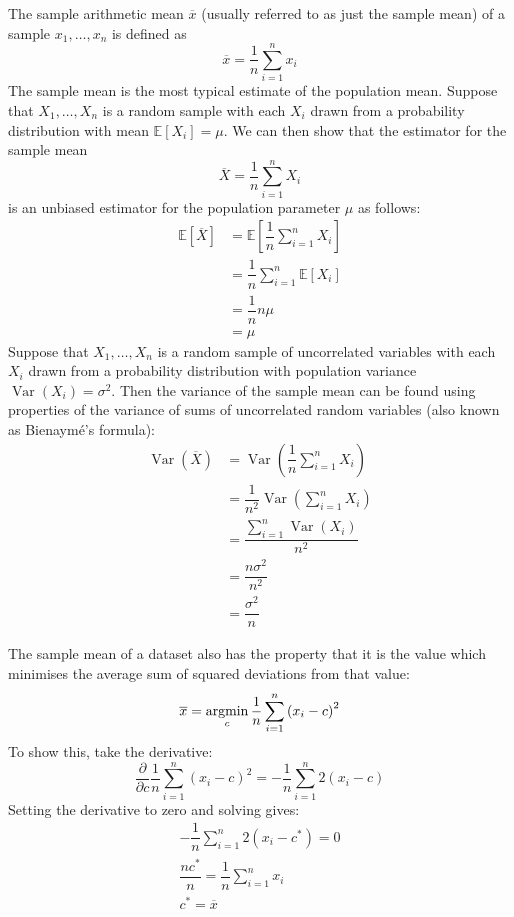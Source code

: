 \documentclass[11pt]{report} %
\begin{document}
The sample arithmetic mean $\overline{x}$ (usually referred to as just the sample mean) of a sample $x_{1}, \dots, x_{n}$ is defined as
\begin{equation}
\overline{x} = \dfrac{1}{n}\sum_{i = 1}^{n}x_{i}
\end{equation}
The sample mean is the most typical estimate of the population mean. Suppose that $X_{1}, \dots, X_{n}$ is a random sample with each $X_{i}$ drawn from a probability distribution with mean $\mathbb{E}\left[X_{i}\right] = \mu$. We can then show that the estimator for the sample mean
\begin{equation}
\overline{X} = \dfrac{1}{n}\sum_{i = 1}^{n}X_{i}
\end{equation}
is an unbiased estimator for the population parameter $\mu$ as follows:
\begin{align}
\mathbb{E}\left[\overline{X}\right] &= \mathbb{E}\left[\dfrac{1}{n}\sum_{i = 1}^{n}X_{i}\right] \\
&= \dfrac{1}{n}\sum_{i = 1}^{n}\mathbb{E}\left[X_{i}\right] \\
&= \dfrac{1}{n}n\mu \\
&= \mu
\end{align}
Suppose that $X_{1}, \dots, X_{n}$ is a random sample of uncorrelated variables with each $X_{i}$ drawn from a probability distribution with population variance $\operatorname{Var}\left(X_{i}\right) = \sigma^{2}$. Then the variance of the sample mean can be found using properties of the variance of sums of uncorrelated random variables (also known as Bienaym\'{e}'s formula):
\begin{align}
\operatorname{Var}\left(\overline{X}\right) &= \operatorname{Var}\left(\dfrac{1}{n}\sum_{i = 1}^{n}X_{i}\right) \\
&= \dfrac{1}{n^{2}}\operatorname{Var}\left(\sum_{i = 1}^{n}X_{i}\right) \\
&= \dfrac{\sum_{i = 1}^{n}\operatorname{Var}\left(X_{i}\right)}{n^{2}} \\
&= \dfrac{n\sigma^{2}}{n^{2}} \\
&= \dfrac{\sigma^{2}}{n}
\end{align}

The sample mean of a dataset also has the property that it is the value which minimises the average sum of squared deviations from that value:
\begin{equation}
\overline{x} = \operatorname*{argmin}_{c}\dfrac{1}{n}\sum_{i = 1}^{n}\left(x_{i} - c\right)^{2}
\end{equation}
To show this, take the derivative:
\begin{equation}
\dfrac{\partial}{\partial c}\dfrac{1}{n}\sum_{i = 1}^{n}\left(x_{i} - c\right)^{2} = -\dfrac{1}{n}\sum_{i = 1}^{n}2\left(x_{i} - c\right)
\end{equation}
Setting the derivative to zero and solving gives:
\begin{gather}
-\dfrac{1}{n}\sum_{i = 1}^{n}2\left(x_{i} - c^{*}\right) = 0 \\
\dfrac{nc^{*}}{n} = \dfrac{1}{n}\sum_{i = 1}^{n}x_{i} \\
c^{*} = \overline{x}
\end{gather}
\end{document}
